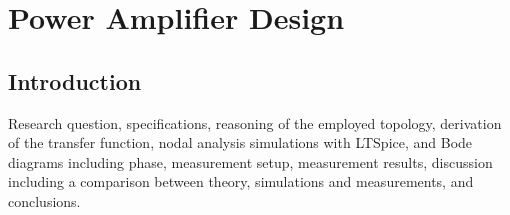 \chapter{Power Amplifier Design}
\label{chapter:PowerAmplifierDesign}




\section{Introduction}
Research question, specifications, reasoning of the employed topology,
derivation of the transfer function, nodal analysis simulations with LTSpice, and Bode diagrams including phase, measurement setup, measurement results, discussion including a comparison between theory, simulations and measurements, and conclusions.
